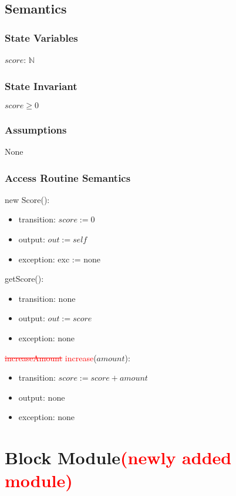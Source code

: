 \documentclass[12pt]{article}
\begin{document}
\subsection*{Semantics}
\subsubsection*{State Variables}
$\mathit{score}$: $\mathbb{N}$
\subsubsection*{State Invariant}
$score \geq 0$
\subsubsection*{Assumptions}
None
\subsubsection*{Access Routine Semantics}
\noindent new Score():
\begin{itemize}
\item transition: $\mathit{score} := 0$
\item output: $out := \mathit{self}$
\item exception: exc := none
\end{itemize}
\newpage

\noindent getScore():
\begin{itemize}
\item transition: none
\item output: $out := score$
\item exception: none
\end{itemize}

\noindent \textcolor{red}{\st{
increaseAmount} increase}($\mathit{amount}$):
\begin{itemize}
\item transition: $score := score + amount$ 
\item output: none
\item exception: none
\end{itemize}
\newpage

\section{Block Module\textcolor{red}{(newly added module)}}
\end{document}
